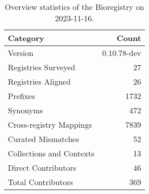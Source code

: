 \begin{table}
\caption{Overview statistics of the Bioregistry on 2023-11-16.}
\label{tab:bioregistry-summary}
\begin{tabular}{lr}
\toprule
Category & Count \\
\midrule
Version & 0.10.78-dev \\
Registries Surveyed & 27 \\
Registries Aligned & 26 \\
Prefixes & 1732 \\
Synonyms & 472 \\
Cross-registry Mappings & 7839 \\
Curated Mismatches & 52 \\
Collections and Contexts & 13 \\
Direct Contributors & 46 \\
Total Contributors & 369 \\
\bottomrule
\end{tabular}
\end{table}
